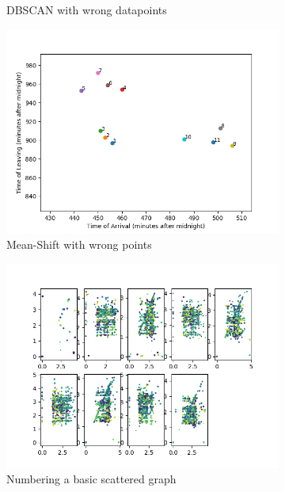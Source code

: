 \documentclass[paper=a4, fontsize=11pt]{article}
\begin{document}
\begin{figure}[H]
\begin{subfigure}[b]{0.3\linewidth}
    \caption{DBSCAN with wrong datapoints}
 \label{fig:piechar1}
  \end{subfigure}
  \begin{subfigure}[b]{0.3\linewidth}
    \includegraphics[width=\linewidth]{numbertestset.png}
    \caption{Mean-Shift with wrong points}
\label{fig:numbered1}
  \end{subfigure}
  \begin{subfigure}[b]{0.2\linewidth}
    \includegraphics[width=\linewidth]{multiple_dimension_6.png}
  \caption{Numbering a basic scattered graph}
  \label{fig:scattergraph1}
  \end{subfigure}
 \begin{subfigure}[b]{0.2\linewidth}

\end{subfigure}
\end{figure}
\end{document}
